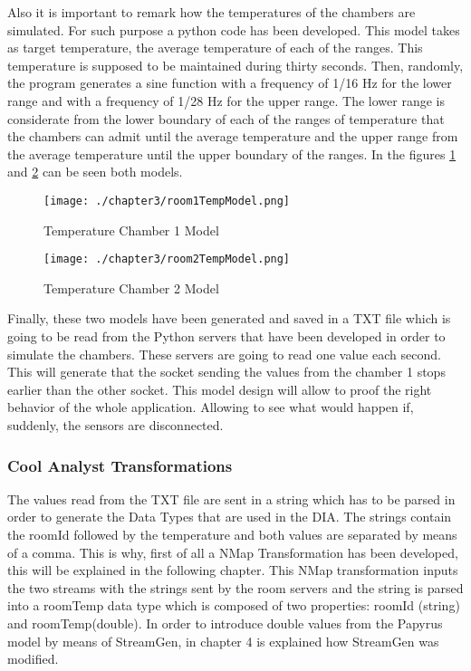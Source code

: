 Also it is important to remark how the temperatures of the chambers are simulated. For such purpose a python code has been developed. This model takes as target temperature, the average temperature of each of the ranges. This temperature is supposed to be maintained during thirty seconds. Then, randomly, the program generates a sine function with a frequency of 1/16 Hz for the lower range and with a frequency of 1/28 Hz for the upper range. The lower range is considerate from the lower boundary of each of the ranges of temperature that the chambers can admit until the average temperature and the upper range from the average temperature until the upper boundary of the ranges. In the figures \ref{fig:Temperature Chamber 1 Model} and \ref{fig:Temperature Chamber 2 Model} can be seen both models.

\begin{figure}
\centering
{\texttt{[image: ./chapter3/room1TempModel.png]}}
\caption{Temperature Chamber 1 Model}
\label{fig:Temperature Chamber 1 Model}
\end{figure}

\begin{figure}
\centering
{\texttt{[image: ./chapter3/room2TempModel.png]}}
\caption{Temperature Chamber 2 Model}
\label{fig:Temperature Chamber 2 Model}
\end{figure}

Finally, these two models have been generated and saved in a TXT file which is going to be read from the Python servers that have been developed in order to simulate the chambers. These servers are going to read one value each second. This will generate that the socket sending the values from the chamber 1 stops earlier than the other socket. This model design will allow to proof the right behavior of the whole application. Allowing to see what would happen if, suddenly, the sensors are disconnected.

\subsubsection*{Cool Analyst Transformations}

The values read from the TXT file are sent in a string which has to be parsed in order to generate the Data Types that are used in the DIA. The strings contain the roomId followed by the temperature and both values are separated by means of a comma. This is why, first of all a NMap Transformation has been developed, this will be explained in the following chapter. This NMap transformation inputs the two streams with the strings sent by the room servers and the string is parsed into a roomTemp data type which is composed of two properties: roomId (string) and roomTemp(double). In order to introduce double values from the Papyrus model by means of StreamGen, in chapter 4 is explained how StreamGen was modified.

